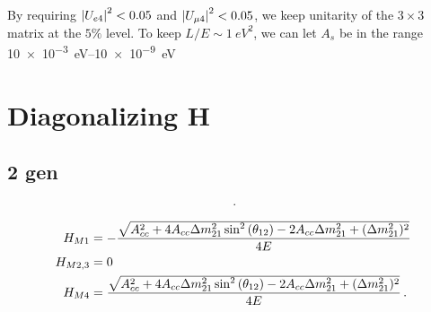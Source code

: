 \documentclass[twocolumn]{article}
\newcommand*{\dm}[1][]{%
  \Delta m^2\ifx\\#1\\\else_\text{#1}\fi
}
\begin{document}
By requiring $\abs{U_{e4}}^2 < 0.05$ and $\abs{U_{\mu 4}}^2 < 0.05$, we keep unitarity of the $3 \times 3$ matrix at the $5\%$ level. To keep $L/E \sim \SI{1}{eV^2}$, we can let $A_s$ be in the range \SIrange{10e-3}{10e-9}{eV}

\section*{Diagonalizing H}
\subsection*{2 gen}
\begin{align*} 

\,.\end{align*}


\begin{align*}
  H_{M1} &= - \frac{\sqrt{A_{cc}^{2} + 4 A_{cc} \dm[21] \sin^{2}{\left(\theta_{12} \right)} - 2 A_{cc} \dm[21] + (\dm[21])^{2}}}{4 E} \\
  H_{M2,3} &=0 \\
  H_{M4} &= \frac{\sqrt{A_{cc}^{2} + 4 A_{cc} \dm[21] \sin^{2}{\left(\theta_{12} \right)} - 2 A_{cc} \dm[21] + (\dm[21])^{2}}}{4 E}
\,.\end{align*}


 
\end{document}
